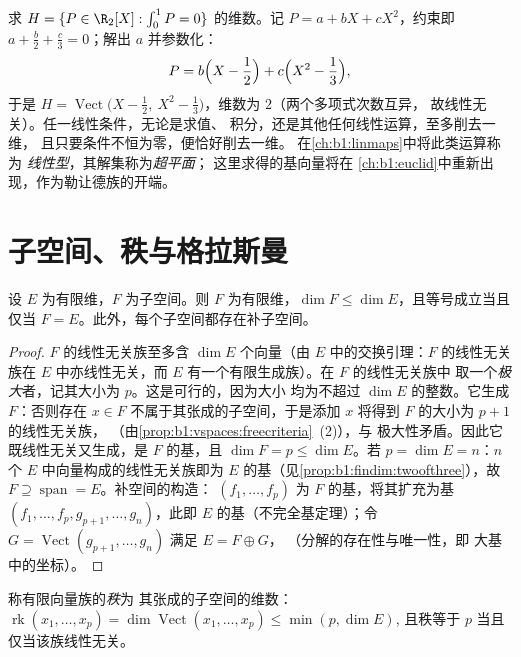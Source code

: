 \begin{example}[积分约束同样削去一维]
\label{ex:b1:findim:integralconstraint}
求 $H = \{P \in \R_2[X] : \int_0^1 P = 0\}$ 的维数。记
$P = a + bX + cX^2$，约束即 $a + \frac b2 + \frac
c3 = 0$；解出 $a$ 并参数化：
\[
P = b\Bigl(X - \frac12\Bigr) + c\Bigl(X^2 - \frac13\Bigr),
\]
于是 $H = \operatorname{Vect}\bigl(X - \frac12,\ X^2 -
\frac13\bigr)$，维数为 $2$（两个多项式次数互异，
故线性无关）。任一线性条件，无论是求值、
积分，还是其他任何线性运算，至多削去一维，
且只要条件不恒为零，便恰好削去一维。
在\cref{ch:b1:linmaps}中将此类运算称为
\emph{线性型}，其解集称为\emph{超平面}；
这里求得的基向量将在
\cref{ch:b1:euclid}中重新出现，作为勒让德族的开端。
\end{example}

\section{子空间、秩与格拉斯曼}

\begin{theorem}[子空间]\label{thm:b1:findim:subspaces}
设 $E$ 为有限维，$F$ 为子空间。则 $F$
为有限维，$\dim F \leq \dim E$，且等号成立当且仅当
$F = E$。此外，每个子空间都存在补子空间。
\end{theorem}

\begin{proof}
$F$ 的线性无关族至多含 $\dim E$ 个向量（由
$E$ 中的交换引理：$F$ 的线性无关族在 $E$ 中亦线性无关，而 $E$
有一个有限生成族）。在 $F$ 的线性无关族中
取一个\emph{极大}者，记其大小为 $p$。这是可行的，因为大小
均为不超过 $\dim E$ 的整数。它生成 $F$：否则存在
$x \in F$ 不属于其张成的子空间，于是添加 $x$ 将得到
$F$ 的大小为 $p + 1$ 的线性无关族，
（由\cref{prop:b1:vspaces:freecriteria}~(2)），与
极大性矛盾。因此它既线性无关又生成，是 $F$ 的基，且
$\dim F = p \leq \dim E$。若 $p = \dim E = n$：$n$ 个
$E$ 中向量构成的线性无关族即为 $E$ 的基（见\cref{prop:b1:findim:twoofthree}），故 $F
\supseteq \operatorname{span} = E$。补空间的构造：
$(f_1, \dots, f_p)$ 为 $F$ 的基，将其扩充为基 $(f_1, \dots, f_p, g_{p+1},
\dots, g_n)$，此即 $E$ 的基（不完全基定理）；令 $G =
\operatorname{Vect}(g_{p+1}, \dots, g_n)$ 满足 $E = F \oplus G$，
（分解的存在性与唯一性，即
大基中的坐标）。
\end{proof}

\begin{definition}[族的秩]\label{def:b1:findim:rank}
称有限向量族的\emph{秩}为
其张成的子空间的维数：
$\operatorname{rk}(x_1, \dots, x_p) = \dim
\operatorname{Vect}(x_1, \dots, x_p) \leq \min(p, \dim E)$,
且秩等于 $p$ 当且仅当该族线性无关。
\end{definition}

